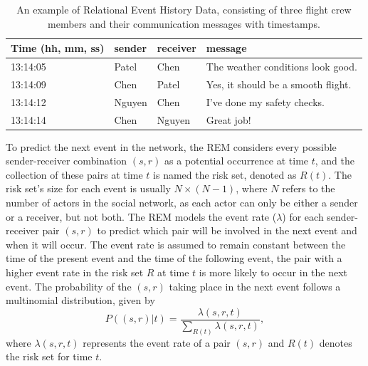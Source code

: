 \documentclass[]{interact}
\theoremstyle{plain}%
\theoremstyle{definition}
\theoremstyle{remark}
\begin{document}
	\begin{table}[H]
		\centering
		\renewcommand{\arraystretch}{1.1} %
		\small
		\caption{An example of Relational Event History Data, consisting of three flight crew members and their communication messages with timestamps.}
		\begin{tabular}{llll}
			\hline
			Time (hh,  mm, ss) & sender & receiver & message                                  \\ \hline
			13:14:05           & Patel  & Chen     & The weather conditions look good.        \\
			13:14:09           & Chen   & Patel    & Yes, it should be a smooth flight.       \\
			13:14:12           & Nguyen & Chen     & I've done my safety checks.              \\
			13:14:14           & Chen   & Nguyen   & Great job!                               \\ \hline
		\end{tabular}
		\label{Table 1}
	\end{table}
	
	To predict the next event in the network, the REM considers every possible sender-receiver combination $(s,r)$ as a potential occurrence at time $t$, and the collection of these pairs at time $t$ is named the risk set, denoted as $R(t)$. The risk set's size for each event is usually $N \times (N-1)$, where $N$ refers to the number of actors in the social network, as each actor can only be either a sender or a receiver, but not both. The REM models the event rate ($\lambda$) for each sender-receiver pair $(s,r)$ to predict which pair will be involved in the next event and when it will occur. The event rate is assumed to remain constant between the time of the present event and the time of the following event, the pair with a higher event rate in the risk set $R$ at time $t$ is more likely to occur in the next event. The probability of the $(s,r)$ taking place in the next event follows a multinomial distribution\cite{buttsRelationalEventFramework2008}, given by
	\begin{equation} \label{1}
		P \left((s,r) | t \right) = \dfrac{\lambda(s,r,t)} {\sum_{R(t)} \lambda(s,r,t)},
	\end{equation}
	where $\lambda(s,r,t)$ represents the event rate of a pair $(s,r)$ and $R(t)$ denotes the risk set for time $t$. \\
	
\end{document}
